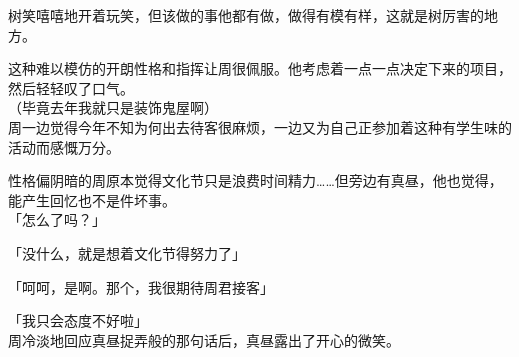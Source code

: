 树笑嘻嘻地开着玩笑，但该做的事他都有做，做得有模有样，这就是树厉害的地方。

这种难以模仿的开朗性格和指挥让周很佩服。他考虑着一点一点决定下来的项目，然后轻轻叹了口气。\\

（毕竟去年我就只是装饰鬼屋啊）\\

周一边觉得今年不知为何出去待客很麻烦，一边又为自己正参加着这种有学生味的活动而感慨万分。

性格偏阴暗的周原本觉得文化节只是浪费时间精力……但旁边有真昼，他也觉得，能产生回忆也不是件坏事。\\

「怎么了吗？」

「没什么，就是想着文化节得努力了」

「呵呵，是啊。那个，我很期待周君接客」

「我只会态度不好啦」\\

周冷淡地回应真昼捉弄般的那句话后，真昼露出了开心的微笑。
